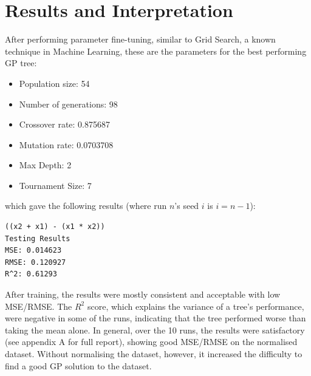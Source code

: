 \documentclass{article}
\begin{document}
\section{Results and Interpretation}
After performing parameter fine-tuning, similar to Grid Search, a known technique in Machine Learning, these are the parameters for the best performing GP tree:
\begin{itemize}
  \item Population size: 54
  \item Number of generations: 98
  \item Crossover rate: 0.875687
  \item Mutation rate: 0.0703708
  \item Max Depth: 2
  \item Tournament Size: 7
\end{itemize}
which gave the following results (where run \(n\)'s seed \(i\) is \(i = n-1\)):
\begin{verbatim}
((x2 + x1) - (x1 * x2))
Testing Results
MSE: 0.014623
RMSE: 0.120927
R^2: 0.61293
\end{verbatim}

After training, the results were mostly consistent and acceptable with low MSE/RMSE. The \(R^2\) score, which explains the variance of a tree's performance, were negative in some of the runs, indicating that the tree performed worse than taking the mean alone. In general, over the 10 runs, the results were satisfactory (see appendix A for full report), showing good MSE/RMSE on the normalised dataset. Without normalising the dataset, however, it increased the difficulty to find a good GP solution to the dataset.
\end{document}

